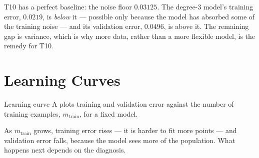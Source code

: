 T10 has a perfect baseline: the noise floor $0.03125$. The degree-$3$ model's
training error, $0.0219$, is \emph{below} it --- possible only because the
model has absorbed some of the training noise --- and its validation error,
$0.0496$, is above it. The remaining gap is variance, which is why more data,
rather than a more flexible model, is the remedy for T10.

\section{Learning Curves}
\label{sec:learning-curves}

\begin{defbox}{Learning curve}
A  plots training and validation error against the number
of training examples, $m_{\text{train}}$, for a fixed model.
\end{defbox}

As $m_{\text{train}}$ grows, training error rises --- it is harder to fit more
points --- and validation error falls, because the model sees more of the
population. What happens next depends on the diagnosis.

